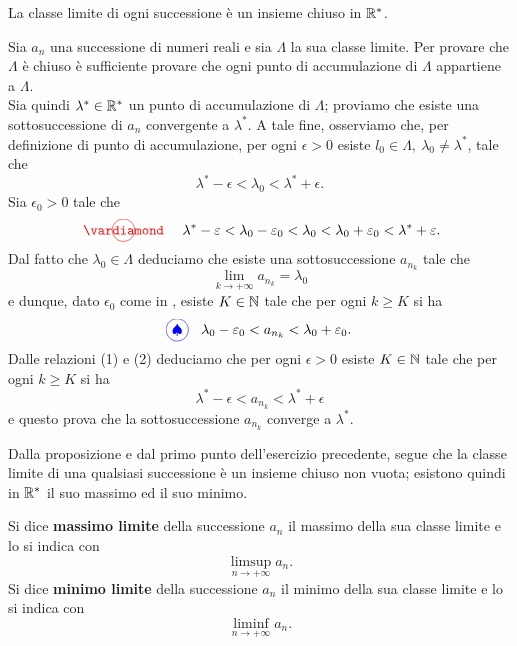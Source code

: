 \begin{proposition}
	La classe limite di ogni successione è un insieme chiuso in $\mathbb{R}^{\ast}$.
\end{proposition}
\begin{demonstration}
	Sia $a_n$ una successione di numeri reali e sia $\Lambda$ la sua classe limite. Per provare che $\Lambda$ è chiuso è sufficiente provare che ogni punto di accumulazione di $\Lambda$ appartiene a  $\Lambda$.\\
	Sia quindi $\lambda^{\ast} \in \mathbb{R}^{\ast}$ un punto di accumulazione di $\Lambda$; proviamo che esiste una sottosuccessione di $a_n$ convergente a $\lambda^{\ast}$. A tale fine, osserviamo che, per definizione di punto di accumulazione, per ogni $\epsilon >0$ esiste $l_0\in \Lambda,\ \lambda_0\neq \lambda^{\ast}$, tale che 
	\begin{equation*}
		\lambda^{\ast}-\epsilon < \lambda_0<\lambda^{\ast}+\epsilon.
	\end{equation*}
Sia $\epsilon_0>0$ tale che
\begin{equation*}
	\circled[red]{\vardiamond}\quad\lambda^{\ast}-\epsilon < \lambda_0-\epsilon_0< \lambda_0<\lambda_0+\epsilon_0 < \lambda^{\ast}+\epsilon.
\end{equation*}
Dal fatto che $\lambda_0\in \Lambda$ deduciamo che esiste una sottosuccessione $a_{n_k}$ tale che
\begin{equation*}
	\lim_{k\to +\infty} a_{n_k}=\lambda_0
\end{equation*}
e dunque, dato $\epsilon_0$ come in \circled[red]{\vardiamond}, esiste $K\in \mathbb{N}$ tale che per ogni $k\geq K$ si ha
\begin{equation*}
	\circled[blue]{\spadesuit}\quad  \lambda_0-\epsilon_0< a_{n_k}<\lambda_0+\epsilon_0.
\end{equation*}
Dalle relazioni (1) e (2) deduciamo che per ogni $\epsilon >0$ esiste $K\in \mathbb{N}$ tale che per ogni $k\geq K$ si ha
\begin{equation*}
	\lambda^{\ast}-\epsilon< a_{n_k}<\lambda^{\ast}+\epsilon
\end{equation*}
e questo prova che la sottosuccessione $a_{n_k}$ converge a $\lambda^{\ast}$.
\end{demonstration}
Dalla proposizione e dal primo punto dell'esercizio precedente, segue che la classe limite di una qualsiasi successione è un insieme chiuso non vuota; esistono quindi in $\mathbb{R}^{\ast}$ il suo massimo ed il suo minimo.
\begin{define}
Si dice \textbf{massimo limite} della successione $a_n$ il massimo della sua classe limite e lo si indica con 
	\begin{equation}
		\limsup_{n\to +\infty} a_{n}.
	\end{equation}
Si dice \textbf{minimo limite} della successione $a_n$ il minimo della sua classe limite e lo si indica con
\begin{equation*}
	\liminf_{n\to +\infty} a_{n}.
\end{equation*}
\end{define}
